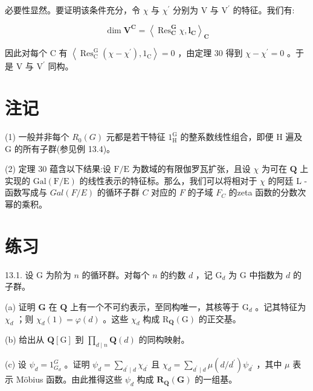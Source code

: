 \documentclass[10pt]{article}
\begin{document}
必要性显然。要证明该条件充分，令 \(\chi\) 与 \({\chi }^{\prime }\) 分别为 \(\mathrm{V}\) 与 \({\mathrm{V}}^{\prime }\) 的特征。我们有:

\[
\dim {\mathbf{V}}^{\mathbf{C}} = {\left\langle  {\operatorname{Res}}_{\mathbf{C}}^{\mathbf{G}}\chi ,{\mathbf{l}}_{\mathbf{C}}\right\rangle  }_{\mathbf{C}}
\]

因此对每个 \(\mathrm{C}\) 有 \(\left\langle  {{\operatorname{Res}}_{\mathrm{C}}^{\mathrm{G}}\left( {\chi  - {\chi }^{\prime }}\right) ,{1}_{\mathrm{C}}}\right\rangle   = 0\) ，由定理 30 得到 \(\chi  - {\chi }^{\prime } = 0\) 。于是 \(\mathrm{V}\) 与 \({\mathrm{V}}^{\prime }\) 同构。

\section*{注记}

(1) 一般并非每个 \({R}_{0}\left( G\right)\) 元都是若干特征 \({1}_{\mathrm{H}}^{\mathrm{G}}\) 的整系数线性组合，即便 \(\mathrm{H}\) 遍及 \(\mathrm{G}\) 的所有子群(参见例 13.4)。

(2) 定理 30 蕴含以下结果:设 \(\mathrm{F}/\mathrm{E}\) 为数域的有限伽罗瓦扩张，且设 \(\chi\) 为可在 \(\mathbf{Q}\) 上实现的 \(\mathrm{{Gal}}\left( {\mathrm{F}/\mathrm{E}}\right)\) 的线性表示的特征标。那么，我们可以将相对于 \(\chi\) 的阿廷 L - 函数写成与 \({Gal}\left( {F/E}\right)\) 的循环子群 \(C\) 对应的 \(F\) 的子域 \({F}_{C}\) 的zeta 函数的分数次幂的乘积。

\section*{练习}

13.1. 设 \(\mathrm{G}\) 为阶为 \(n\) 的循环群。对每个 \(n\) 的约数 \(d\) ，记 \({\mathrm{G}}_{d}\) 为 \(\mathrm{G}\) 中指数为 \(d\) 的子群。

(a) 证明 \(\mathbf{G}\) 在 \(\mathbf{Q}\) 上有一个不可约表示，至同构唯一，其核等于 \({\mathrm{G}}_{d}\) 。记其特征为 \({\chi }_{d}\) ；则 \({\chi }_{d}\left( 1\right)  = \varphi \left( d\right)\) 。这些 \({\chi }_{d}\) 构成 \({\mathrm{R}}_{\mathbf{Q}}\left( \mathrm{G}\right)\) 的正交基。

(b) 给出从 \(\mathbf{Q}\left\lbrack  \mathrm{G}\right\rbrack\) 到 \(\mathop{\prod }\limits_{{d \mid  n}}\mathbf{Q}\left( d\right)\) 的同构映射。

(c) 设 \({\psi }_{d} = {1}_{{G}_{d}}^{G}\) 。证明 \({\psi }_{d} = \mathop{\sum }\limits_{{{d}^{\prime } \mid  d}}{\chi }_{{d}^{\prime }}\) 且 \({\chi }_{d} = \mathop{\sum }\limits_{{{d}^{\prime } \mid  d}}\mu \left( {d/{d}^{\prime }}\right) {\psi }_{{d}^{\prime }}\) ，其中 \(\mu\) 表示 Möbius 函数。由此推得这些 \({\psi }_{d}\) 构成 \({\mathbf{R}}_{\mathbf{Q}}\left( \mathbf{G}\right)\) 的一组基。
\end{document}
